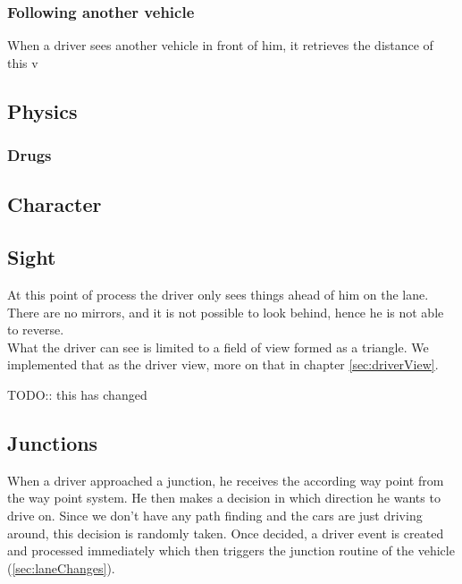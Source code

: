 \subsubsection{Following another vehicle}

When a driver sees another vehicle in front of him, it retrieves the distance
of this v

% 

\subsection{Physics}
\label{sec:physics}

\subsubsection{Drugs}
\label{sec:drugs}

\subsection{Character}
\label{sec:character}

\subsection{Sight}
\label{sec:sight}

At this point of process the driver only sees things ahead of him on the
lane. There are no mirrors, and it is not possible to look behind, hence
he is not able to reverse.\\

\noindent What the driver can see is limited to a field of view formed as 
a triangle.  We implemented that as the driver view, more on that in chapter 
\ref{sec:driverView}.

TODO:: this has changed

\subsection{Junctions}
\label{sec:driverJunctions}

When a driver approached a junction, he receives the according way point
from the way point system. He then makes a decision in which direction he
wants to drive on. Since we don't have any path finding and the cars are
just driving around, this decision is randomly taken. Once decided, a
driver event is created and processed immediately which then triggers
the junction routine of the vehicle (\ref{sec:laneChanges}).

